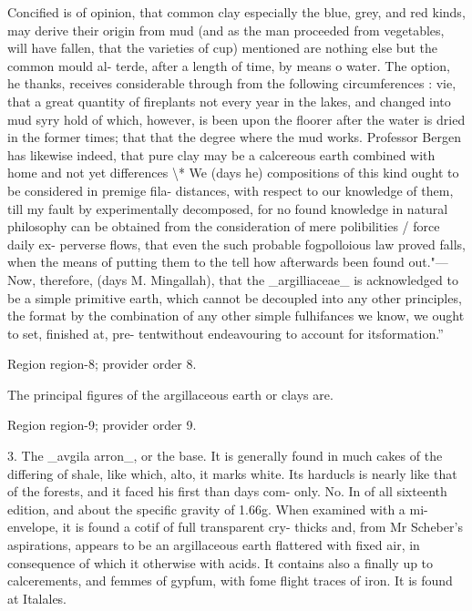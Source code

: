 \documentclass[11pt]{article}
\begin{document}
Concified is of opinion, that common clay especially the blue, grey, and red kinds, may derive their origin from mud (and as the man proceeded from vegetables, will have fallen, that the varieties of cup) mentioned are nothing else but the common mould al- terde, after a length of time, by means o water. The option, he thanks, receives considerable through from the following circumferences : vie, that a great quantity of fireplants not every year in the lakes, and changed into mud syry hold of which, however, is been upon the floorer after the water is dried in the former times; that that the degree where the mud works. Professor Bergen has likewise indeed, that pure clay may be a calcereous earth combined with home and not yet differences \textbackslash{}* We (days he) compositions of this kind ought to be considered in premige fila- distances, with respect to our knowledge of them, till my fault by experimentally decomposed, for no found knowledge in natural philosophy can be obtained from the consideration of mere polibilities / force daily ex- perverse flows, that even the such probable fogpolloious law proved falls, when the means of putting them to the tell how afterwards been found out."— Now, therefore, (days M. Mingallah), that the \_argilliaceae\_ is acknowledged to be a simple primitive earth, which cannot be decoupled into any other principles, the format by the combination of any other simple fulhifances we know, we ought to set, finished at, pre- tentwithout endeavouring to account for itsformation.”
\par

{\scriptsize\color{gray} Region region-8; provider order 8.\par}
\medskip

The principal figures of the argillaceous earth or clays are.
\par

{\scriptsize\color{gray} Region region-9; provider order 9.\par}
\medskip

3. The \_avgila arron\_, or the base. It is generally found in much cakes of the differing of shale, like which, alto, it marks white. Its harducls is nearly like that of the forests, and it faced his first than days com- only. No. In of all sixteenth edition, and about the specific gravity of 1.66g. When examined with a mi- envelope, it is found a cotif of full transparent cry- thicks and, from Mr Scheber’s aspirations, appears to be an argillaceous earth flattered with fixed air, in consequence of which it otherwise with acids. It contains also a finally up to calcerements, and femmes of gypfum, with fome flight traces of iron. It is found at Italales.
\par
\end{document}
